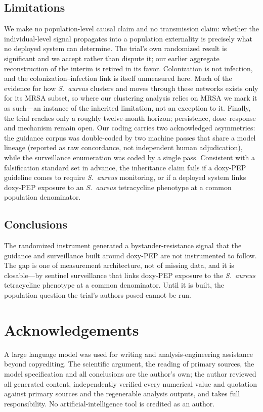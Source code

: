\documentclass[12pt,a4paper]{article}
\newcommand{\sa}{\emph{S.~aureus}}
\begin{document}
\subsection*{Limitations}
We make no population-level causal claim and no transmission claim: whether the
individual-level signal propagates into a population externality is precisely what
no deployed system can determine. The trial's own randomized result is
significant and we accept rather than dispute it; our earlier aggregate
reconstruction of the interim is retired in its favor. Colonization is not
infection, and the colonization--infection link is itself unmeasured here. Much of
the evidence for how \sa{} clusters and moves through these networks exists only
for its MRSA subset, so where our clustering analysis relies on MRSA we mark it as
such---an instance of the inherited limitation, not an exception to it. Finally,
the trial reaches only a roughly twelve-month horizon; persistence, dose--response
and mechanism remain open. Our coding carries two acknowledged asymmetries: the
guidance corpus was double-coded by two machine passes that share a model lineage
(reported as raw concordance, not independent human adjudication), while the
surveillance enumeration was coded by a single pass. Consistent with a
falsification standard set in advance, the inheritance claim fails if a doxy-PEP
guideline comes to require
\sa{} monitoring, or if a deployed system links doxy-PEP exposure to an \sa{}
tetracycline phenotype at a common population denominator.

\subsection*{Conclusions}
The randomized instrument generated a bystander-resistance signal that the
guidance and surveillance built around doxy-PEP are not instrumented to follow.
The gap is one of measurement architecture, not of missing data, and it is
closable---by sentinel surveillance that links doxy-PEP exposure to the \sa{}
tetracycline phenotype at a common denominator. Until it is built, the population
question the trial's authors posed cannot be run.

\section*{Acknowledgements}
A large language model was used for writing and analysis-engineering assistance
beyond copyediting. The scientific argument, the reading of primary sources, the
model specification and all conclusions are the author's own; the author reviewed
all generated content, independently verified every numerical value and quotation
against primary sources and the regenerable analysis outputs, and takes full
responsibility. No artificial-intelligence tool is credited as an author.
\end{document}
